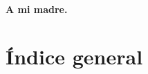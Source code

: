\documentclass[a4paper,11pt,openany]{book} %
\date{}
\begin{document}

\frontmatter

\newpage
\begin{em}
	\vspace*{3cm}
	\hfill \textbf{A mi madre.}
\end{em}
\thispagestyle{empty}
\mbox{}

\clearpage
\thispagestyle{empty}
\mbox{}



%
%

\pagestyle{empty} %
\chapter*{Índice general}
\makeatletter
{}
\makeatother
\clearpage %
\pagestyle{plain} %
\setcounter{page}{1} %
\newcommand{\vs}{\vspace{0.5cm}}
\newcommand{\hs}{\hspace{3.5pt}}
\newcommand{\cl}{\\[0.1cm]}

\mainmatter
{}










\end{document}
